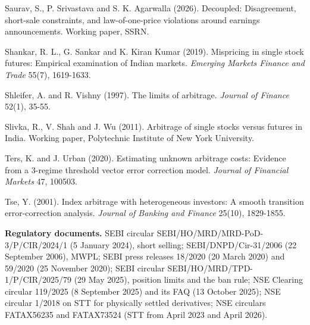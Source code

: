 \begin{description}[leftmargin=1.2em,itemsep=1pt,font=\normalfont]
\item Saurav, S., P. Srivastava and S. K. Agarwalla (2026). Decoupled: Disagreement, short-sale constraints, and law-of-one-price violations around earnings announcements. Working paper, SSRN.
\item Shankar, R. L., G. Sankar and K. Kiran Kumar (2019). Mispricing in single stock futures: Empirical examination of Indian markets. \emph{Emerging Markets Finance and Trade} 55(7), 1619-1633.
\item Shleifer, A. and R. Vishny (1997). The limits of arbitrage. \emph{Journal of Finance} 52(1), 35-55.
\item Slivka, R., V. Shah and J. Wu (2011). Arbitrage of single stocks versus futures in India. Working paper, Polytechnic Institute of New York University.
\item Ters, K. and J. Urban (2020). Estimating unknown arbitrage costs: Evidence from a 3-regime threshold vector error correction model. \emph{Journal of Financial Markets} 47, 100503.
\item Tse, Y. (2001). Index arbitrage with heterogeneous investors: A smooth transition error-correction analysis. \emph{Journal of Banking and Finance} 25(10), 1829-1855.
\end{description}
\vspace{6pt}
{\sloppy\noindent\textbf{Regulatory documents.} SEBI circular SEBI/HO/MRD/MRD-PoD-3/P/CIR/2024/1 (5 January 2024),
short selling; SEBI/DNPD/Cir-31/2006 (22 September 2006), MWPL; SEBI press releases 18/2020 (20 March 2020) and 59/2020
(25 November 2020); SEBI circular SEBI/HO/MRD/TPD-1/P/CIR/2025/79 (29 May 2025), position limits and the ban rule; NSE
Clearing circular 119/2025 (8 September 2025) and its FAQ (13 October 2025); NSE circular 1/2018 on STT for physically
settled derivatives; NSE circulars FATAX56235 and FATAX73524 (STT from April 2023 and April 2026).\par}
\normalsize
